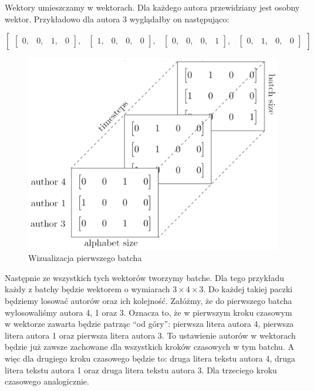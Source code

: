 Wektory umieszczamy w wektorach. Dla każdego autora przewidziany jest osobny wektor. 
Przykładowo dla autora 3 wyglądałby on następująco:
\vspace{3mm}

$
\begin{bmatrix} \begin{bmatrix} 0, & 0, & 1, & 0\end{bmatrix},  & \begin{bmatrix} 1, & 0, & 0, & 0\end{bmatrix}, & \begin{bmatrix} 0, & 0, & 0, & 1\end{bmatrix}, & \begin{bmatrix} 0, & 1, & 0, & 0\end{bmatrix} \end{bmatrix}
$



\begin{figure}
\vspace{-4mm}
\includegraphics[width=\linewidth]{./images/batch.png}
\caption{Wizualizacja pierwszego batcha}
\label{fig:test2}
\vspace{-4mm}
\end{figure}
\vspace{4mm}
Następnie ze wszystkich tych wektorów tworzymy batche.
Dla tego przykładu każdy z batchy będzie wektorem o wymiarach $3 \times 4 \times 3$.
Do każdej takiej paczki będziemy losować autorów oraz ich kolejność. Załóżmy, że do pierwszego batcha
wylosowaliśmy autora 4, 1 oraz 3. Oznacza to, że w pierwszym kroku czasowym w wektorze zawarta będzie 
patrząc ``od góry'': pierwsza litera autora 4, pierwsza litera autora 1 oraz pierwsza litera autora 3.
To ustawienie autorów w wektorach będzie już zawsze zachowane dla wszystkich kroków czasowych w tym batchu. 
A więc dla drugiego kroku czasowego będzie to: druga litera tekstu autora 4, druga litera tekstu autora 1 oraz druga 
litera tekstu autora 3. Dla trzeciego kroku czasowego analogicznie. 

